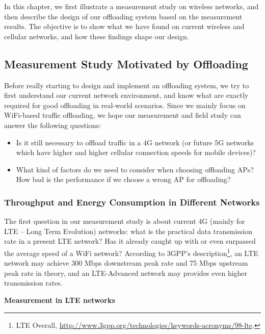 \documentclass[english]{tktltiki}
\begin{document}
In this chapter, we first illustrate a measurement study on wireless networks, and then describe the design of our offloading system based on the measurement results. The objective is to show what we have found on current wireless and cellular networks, and how these findings shape our design. 


\subsection{Measurement Study Motivated by Offloading}


Before really starting to design and implement an offloading system, we try to first understand our current network environment, and know what are exactly required for good offloading in real-world scenarios. Since we mainly focus on WiFi-based traffic offloading, we hope our measurement and field study can answer the following questions:

\begin{itemize}
  \item Is it still necessary to offload traffic in a 4G network (or future 5G networks which have higher and higher cellular connection speeds for mobile devices)?
  \item What kind of factors do we need to consider when choosing offloading APs? How bad is the performance if we choose a wrong AP for offloading?
\end{itemize}

\subsubsection{Throughput and Energy Consumption in Different Networks}

The first question in our measurement study is about current 4G (mainly for LTE -- Long Term Evolution) networks: what is the practical data transmission rate in a present LTE network? Has it already caught up with or even surpassed the average speed of a WiFi network? According to 3GPP's description\footnote{LTE Overall, \url{http://www.3gpp.org/technologies/keywords-acronyms/98-lte}.}, an LTE network may achieve 300 Mbps downstream peak rate and 75 Mbps upstream peak rate in theory, and an LTE-Advanced network may provides even higher transmission rates.

\vspace{1mm}

\textbf{Measurement in LTE networks}

\vspace{1mm}
\end{document}
